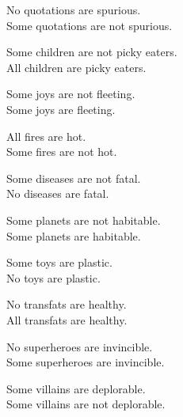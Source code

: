 \begin{exercises}

\item No quotations are spurious.  \\
	Some quotations are not spurious.  

\item Some children are not picky eaters.  \\
	All children are picky eaters. \answer{\\Contradictories}

\item Some joys are not fleeting.  \\
	Some joys are fleeting.  \answer{\\Subcontraries}

\item All fires are hot.  \\
	Some fires are not hot.  \answer{\\Contradictories}

\item Some diseases are not fatal.  \\
	No diseases are fatal.  

\item Some planets are not habitable.  \\
	Some planets are habitable. \answer{\\Subcontraries}

\item Some toys are plastic.  \\
	No toys are plastic.   \answer{\\Contradictories}

\item No transfats are healthy.  \\
	All transfats are healthy.  \answer{\\Contraries}

\item No superheroes are invincible.   \\
	Some superheroes are invincible. \answer{\\Contradictories}

\item Some villains are deplorable.  \\ 
	Some villains are not deplorable.  \answer{\\Subcontraries}

\end{exercises}

